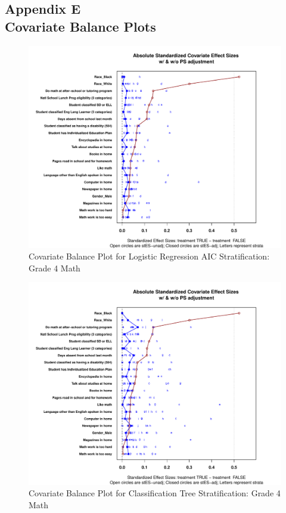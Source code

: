 \subsection*{Appendix E\\Covariate Balance Plots}


\begin{figure}[h!]
\begin{center}
\includegraphics[width=\textwidth]{../Figures2009/g4math-lrAIC-balance.pdf}
\caption{Covariate Balance Plot for Logistic Regression AIC Stratification: Grade 4 Math}
\end{center}
\end{figure}

\begin{figure}
\begin{center}
\includegraphics[width=\textwidth]{../Figures2009/g4math-tree-balance.pdf}
\caption{Covariate Balance Plot for Classification Tree Stratification: Grade 4 Math}
\end{center}
\end{figure}

